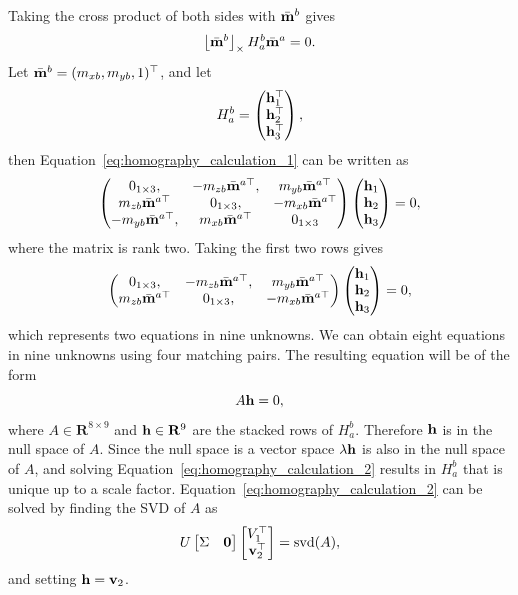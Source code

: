 Taking the cross product of both sides with $\bar{\mathbf{m}}^b$ gives
\begin{equation}\label{eq:homography_calculation_1}
\ss{\bar{\mbf}^b} H_a^b \bar{\mbf}^a = 0.
\end{equation}
Let $\bar{\mathbf{m}}^b = (m_{xb}, m_{yb}, 1)^\top$, and let 
\[
H_a^b = \begin{pmatrix} \mathbf{h}_1^\top \\ \mathbf{h}_2^\top \\ \mathbf{h}_3^\top \end{pmatrix},
\]
then Equation~\eqref{eq:homography_calculation_1} can be written as
\[
\begin{pmatrix}
0_{1\times 3}, & -m_{zb}\bar{\mathbf{m}}^{a\top}, & m_{yb}\bar{\mathbf{m}}^{a\top} \\
m_{zb} \bar{\mathbf{m}}^{a\top} & 0_{1\times 3}, & -m_{xb} \bar{\mathbf{m}}^{a\top} \\
-m_{yb} \bar{\mathbf{m}}^{a\top}, & m_{xb} \bar{\mathbf{m}}^{a\top} & 0_{1\times 3}
\end{pmatrix}\begin{pmatrix} \mathbf{h}_1 \\ \mathbf{h}_2 \\ \mathbf{h}_3 \end{pmatrix} = 0,
\]
where the matrix is rank two.  Taking the first two rows gives
\[
\begin{pmatrix}
0_{1\times 3}, & -m_{zb}\bar{\mathbf{m}}^{a\top}, & m_{yb}\bar{\mathbf{m}}^{a\top} \\
m_{zb} \bar{\mathbf{m}}^{a\top} & 0_{1\times 3}, & -m_{xb} \bar{\mathbf{m}}^{a\top} 
\end{pmatrix}\begin{pmatrix} \mathbf{h}_1 \\ \mathbf{h}_2 \\ \mathbf{h}_3 \end{pmatrix} = 0,
\]
which represents two equations in nine unknowns.  We can obtain eight equations in nine unknowns using four matching pairs.  The resulting equation will be of the form
\begin{equation}\label{eq:homography_calculation_2}
A \hbf = 0,
\end{equation}
where $A\in\mathbf{R}^{8\times 9}$ and $\mathbf{h}\in\mathbf{R}^9$ are the stacked rows of $H_a^b$.  Therefore $\mathbf{h}$ is in the null space of $A$.  Since the null space is a vector space $\lambda\mathbf{h}$ is also in the null space of $A$, and solving Equation~\eqref{eq:homography_calculation_2} results in $H_a^b$ that is unique up to a scale factor.  Equation~\eqref{eq:homography_calculation_2} can be solved by finding the SVD of $A$ as 
\[
U\begin{bmatrix} \Sigma & \mathbf{0} \end{bmatrix} \begin{bmatrix} V_1^\top \\ \mathbf{v}_2^\top \end{bmatrix} = \text{svd}(A),
\]
and setting $\mathbf{h} = \mathbf{v}_2$.  

